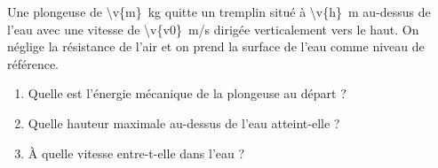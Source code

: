 Une plongeuse de \qty{\v{m}}{kg} quitte un tremplin situé à \qty{\v{h}}{m} au-dessus de l'eau avec une vitesse de \qty{\v{v0}}{m/s} dirigée verticalement vers le haut. On néglige la résistance de l'air et on prend la surface de l'eau comme niveau de référence.

\begin{enumerate}[label=\alph*)]
    \item Quelle est l'énergie mécanique de la plongeuse au départ ?
    \item Quelle hauteur maximale au-dessus de l'eau atteint-elle ?
    \item À quelle vitesse entre-t-elle dans l'eau ?
\end{enumerate}
